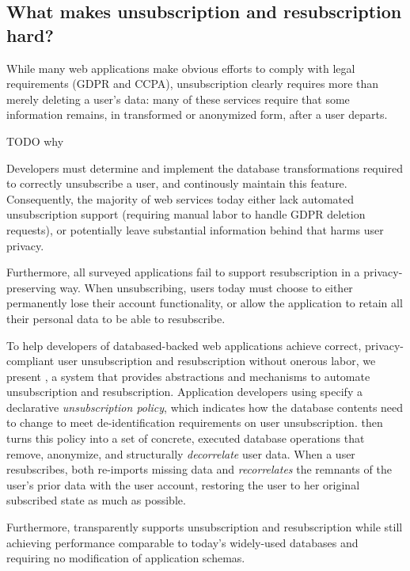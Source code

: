 \subsection{What makes unsubscription and resubscription hard?}

While many web applications make obvious efforts to comply with legal requirements (GDPR and CCPA), 
unsubscription clearly requires more than merely deleting a user's data: many of these services
require that some information remains, in transformed or anonymized form, after a user departs.

TODO why

%
Developers must determine and implement the database transformations required to
correctly unsubscribe a user, and continously maintain this feature.
%
Consequently, the majority of web services today either lack automated unsubscription support
(requiring manual labor to handle \eg GDPR deletion requests), or potentially leave substantial
information behind that harms user privacy.

Furthermore, all surveyed applications fail to support resubscription in a privacy-preserving way.
When unsubscribing, users today must choose to either permanently lose their account functionality,
or allow the application to retain all their personal data to be able to resubscribe.

To help developers of databased-backed web applications achieve correct,
privacy-compliant user unsubscription and resubscription without onerous labor, we present 
\sys, a system that provides abstractions and mechanisms to automate unsubscription and
resubscription.
%
Application developers using \sys specify a declarative \emph{unsubscription policy},
which indicates how the database contents need to change to meet de-identification
requirements on user unsubscription.
%
\sys then turns this policy into a set of concrete, executed database operations that remove,
anonymize, and structurally \emph{decorrelate} user data.
%
When a user resubscribes, \sys both re-imports missing data and
\emph{recorrelates} the remnants of the user's prior data with the user account,
restoring the user to her original subscribed state as much as possible.

Furthermore, \sys transparently supports unsubscription and resubscription while still achieving performance
comparable to today’s widely-used databases and requiring no modification of application schemas.

